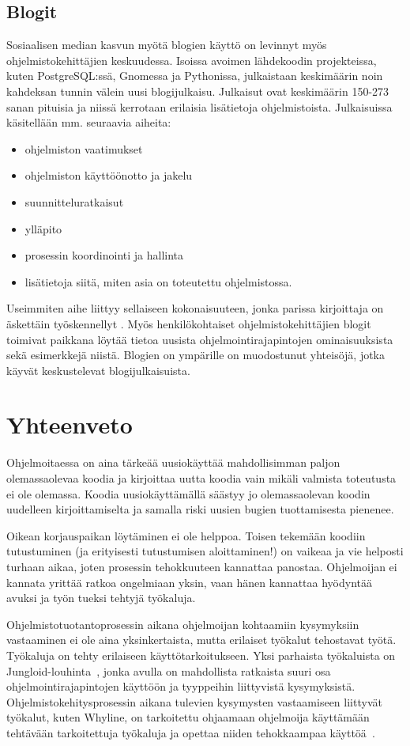 \documentclass[finnish]{tktltiki2}
\theoremstyle{definition}
\theoremstyle{remark}
\begin{document}
\subsection{Blogit}
Sosiaalisen median kasvun myötä blogien käyttö on levinnyt myös ohjelmistokehittäjien keskuudessa. Isoissa avoimen lähdekoodin projekteissa, kuten PostgreSQL:ssä, Gnomessa ja Pythonissa, julkaistaan keskimäärin noin kahdeksan tunnin välein uusi blogijulkaisu. Julkaisut ovat keskimäärin 150-273 sanan pituisia ja niissä kerrotaan erilaisia lisätietoja ohjelmistoista. Julkaisuissa käsitellään mm. seuraavia aiheita:
\begin{itemize}
  \item ohjelmiston vaatimukset
  \item ohjelmiston käyttöönotto ja jakelu
  \item suunnitteluratkaisut
  \item ylläpito
  \item prosessin koordinointi ja hallinta
\item lisätietoja siitä, miten asia on toteutettu ohjelmistossa.
\end{itemize}

Useimmiten aihe liittyy sellaiseen kokonaisuuteen, jonka parissa kirjoittaja on äskettäin työskennellyt \cite{how-dev-blog}.
Myös henkilökohtaiset ohjelmistokehittäjien blogit toimivat paikkana löytää tietoa uusista ohjelmointirajapintojen ominaisuuksista sekä esimerkkejä niistä. Blogien on ympärille on muodostunut yhteisöjä, jotka käyvät keskustelevat blogijulkaisuista.

\section{Yhteenveto}
Ohjelmoitaessa on aina tärkeää uusiokäyttää mahdollisimman paljon olemassaolevaa koodia ja kirjoittaa uutta koodia vain mikäli valmista toteutusta ei ole olemassa. Koodia uusiokäyttämällä säästyy jo olemassaolevan koodin uudelleen kirjoittamiselta ja samalla riski uusien bugien tuottamisesta pienenee.

Oikean korjauspaikan löytäminen ei ole helppoa. Toisen tekemään koodiin tutustuminen (ja erityisesti tutustumisen aloittaminen!) on vaikeaa ja vie helposti turhaan aikaa, joten prosessin tehokkuuteen kannattaa panostaa. Ohjelmoijan ei kannata yrittää ratkoa ongelmiaan yksin, vaan hänen kannattaa hyödyntää avuksi ja työn tueksi tehtyjä työkaluja.

Ohjelmistotuotantoprosessin aikana ohjelmoijan kohtaamiin kysymyksiin vastaaminen ei ole aina yksinkertaista, mutta erilaiset työkalut tehostavat työtä. Työkaluja on tehty erilaiseen käyttötarkoitukseen. Yksi parhaista työkaluista on Jungloid-louhinta~\cite{jungloid-mining}, jonka avulla on mahdollista ratkaista suuri osa ohjelmointirajapintojen käyttöön ja tyyppeihin liittyvistä kysymyksistä. Ohjelmistokehitysprosessin aikana tulevien kysymysten vastaamiseen liittyvät työkalut, kuten Whyline, on tarkoitettu ohjaamaan ohjelmoija käyttämään tehtävään tarkoitettuja työkaluja ja opettaa niiden tehokkaampaa käyttöä~\cite{whyline}.
\end{document}
